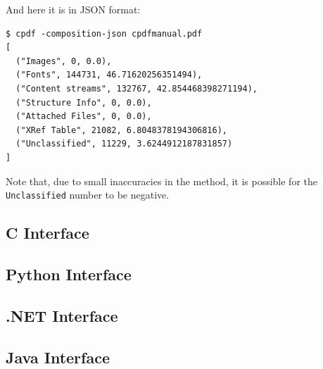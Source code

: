 \documentclass{book}
\begin{document}
\noindent And here it is in JSON format:

\begin{framed}\small\begin{verbatim}$ cpdf -composition-json cpdfmanual.pdf
[
  ("Images", 0, 0.0),
  ("Fonts", 144731, 46.71620256351494),
  ("Content streams", 132767, 42.854468398271194),
  ("Structure Info", 0, 0.0),
  ("Attached Files", 0, 0.0),
  ("XRef Table", 21082, 6.8048378194306816),
  ("Unclassified", 11229, 3.6244912187831857)
]
\end{verbatim}
\end{framed}\pagestyle{empty}\thispagestyle{fancy}

\noindent Note that, due to small inaccuracies in the method, it is possible for the \texttt{Unclassified} number to be negative.

\begin{cpdflib}
\clearpage
\section*{C Interface}
\begin{small}\tt

\end{small}
\end{cpdflib}

\begin{pycpdflib}
\clearpage
\section*{Python Interface}
\begin{small}\tt

\end{small}
\end{pycpdflib}

\begin{dotnetcpdflib}
\clearpage
\section*{.NET Interface}
\begin{small}\tt

\end{small}
\end{dotnetcpdflib}

\begin{jcpdflib}
\clearpage
\section*{Java Interface}
\begin{small}\tt

\end{small}
\end{jcpdflib}
\end{document}
